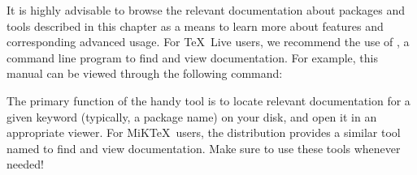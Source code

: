 It is highly advisable to browse the relevant documentation about packages and tools described in this chapter as a means to learn more about features and corresponding advanced usage. For \TeX\ Live users, we recommend the use of , a command line program to find and view documentation. For example, this manual can be viewed through the following command:


The primary function of the handy  tool is to locate relevant documentation for a given keyword (typically, a package name) on your disk, and open it in an appropriate viewer. For MiK\TeX\ users, the distribution provides a similar tool named  to find and view documentation. Make sure to use these tools whenever needed!
